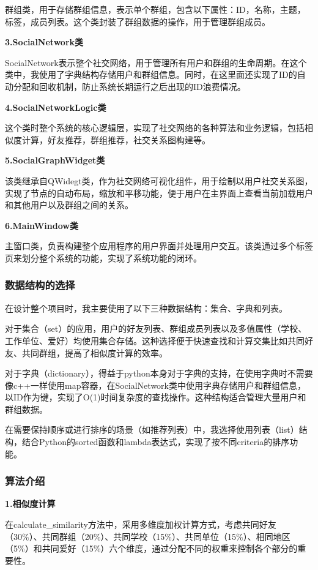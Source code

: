 \documentclass[12pt,a4paper]{article}
\begin{document}
群组类，用于存储群组信息，表示单个群组，包含以下属性：ID，名称，主题，标签，成员列表。这个类封装了群组数据的操作，用于管理群组成员。

\noindent\textbf{3.SocialNetwork类}

SocialNetwork表示整个社交网络，用于管理所有用户和群组的生命周期。在这个类中，我使用了字典结构存储用户和群组信息。同时，在这里面还实现了ID的自动分配和回收机制，防止系统长期运行之后出现的ID浪费情况。

\noindent\textbf{4.SocialNetworkLogic类}

这个类时整个系统的核心逻辑层，实现了社交网络的各种算法和业务逻辑，包括相似度计算，好友推荐，群组推荐，社交关系图构建等。

\noindent\textbf{5.SocialGraphWidget类}

该类继承自QWidegt类，作为社交网络可视化组件，用于绘制以用户社交关系图，实现了节点的自动布局，缩放和平移功能，便于用户在主界面上查看当前加载用户和其他用户以及群组之间的关系。

\noindent\textbf{6.MainWindow类}

主窗口类，负责构建整个应用程序的用户界面并处理用户交互。该类通过多个标签页来划分整个系统的功能，实现了系统功能的闭环。

\subsubsection{数据结构的选择}

在设计整个项目时，我主要使用了以下三种数据结构：集合、字典和列表。

对于集合（set）的应用，用户的好友列表、群组成员列表以及多值属性（学校、工作单位、爱好）均使用集合存储。这种选择便于快速查找和计算交集比如共同好友、共同群组，提高了相似度计算的效率。

对于字典（dictionary），得益于python本身对于字典的支持，在使用字典时不需要像c++一样使用map容器，在SocialNetwork类中使用字典存储用户和群组信息，以ID作为键，实现了O(1)时间复杂度的查找操作。这种结构适合管理大量用户和群组数据。

在需要保持顺序或进行排序的场景（如推荐列表）中，我选择使用列表（list）结构，结合Python的sorted函数和lambda表达式，实现了按不同criteria的排序功能。

\subsubsection{算法介绍}

\noindent\textbf{1.相似度计算}

在calculate\_similarity方法中，采用多维度加权计算方式，考虑共同好友（30\%）、共同群组（20\%）、共同学校（15\%）、共同单位（15\%）、相同地区（5\%）和共同爱好（15\%）六个维度，通过分配不同的权重来控制各个部分的重要性。
\end{document}
